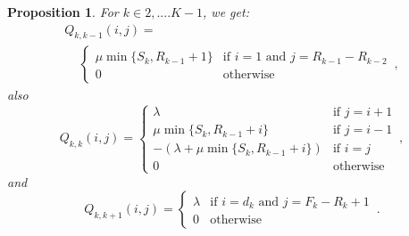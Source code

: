 \documentclass[conference]{IEEEtran}
\newtheorem{prosi}{Proposition}
\begin{document}
\begin{prosi}
For $k \in {2,....K-1}$, we get:
\begin{multline*}
Q_{k,k-1}(i,j)= \\
\quad \,
\begin{cases}
\mu \min\{S_{k},R_{k-1}\!+\!1\}  & \text{if } i= \! 1 \text{ and } j \! = \! R_{k-1} \! - \! R_{k- \! 2}\\
0 & \text{otherwise}
\end{cases}\, ,
\end{multline*}
also
\begin{equation*}
Q_{k,k}(i,j) =
\begin{cases}
\lambda                                 & \text{if } j=i+1\\
\mu \min\{S_{k},R_{k-1}+i\}             & \mbox{if } j=i-1\\
-(\lambda+\mu \min\{S_{k},R_{k-1}+i\})  & \text{if } i=j\\
0                                       & \text{otherwise}
\end{cases}\, ,
\end{equation*}
and
\begin{equation*}
Q_{k,k+1}(i,j) =
\begin{cases}
\lambda             & \text{if } i=d_{k} \text{ and } j=F_{k}-R_{k}+1\\
0                   & \mbox{otherwise}
\end{cases}\, .
\end{equation*}


\end{prosi}
\end{document}
